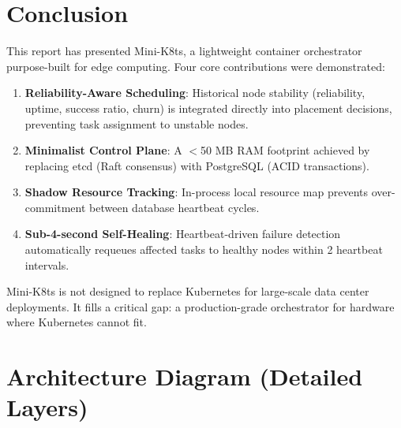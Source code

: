 \documentclass[11pt,a4paper]{article}
\begin{document}
\section{Conclusion}

This report has presented Mini-K8ts, a lightweight container orchestrator purpose-built for
edge computing. Four core contributions were demonstrated:

\begin{enumerate}[label=\textbf{C\arabic*.}]
  \item \textbf{Reliability-Aware Scheduling}: Historical node stability (reliability, uptime,
        success ratio, churn) is integrated directly into placement decisions, preventing
        task assignment to unstable nodes.
  \item \textbf{Minimalist Control Plane}: A $<$50 MB RAM footprint achieved by replacing
        etcd (Raft consensus) with PostgreSQL (ACID transactions).
  \item \textbf{Shadow Resource Tracking}: In-process local resource map prevents
        over-commitment between database heartbeat cycles.
  \item \textbf{Sub-4-second Self-Healing}: Heartbeat-driven failure detection automatically
        requeues affected tasks to healthy nodes within 2 heartbeat intervals.
\end{enumerate}

Mini-K8ts is not designed to replace Kubernetes for large-scale data center deployments.
It fills a critical gap: a production-grade orchestrator for hardware where Kubernetes cannot fit.

\section{Architecture Diagram (Detailed Layers)}
\end{document}
